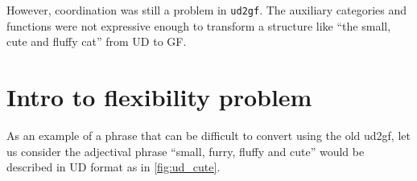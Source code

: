 
However, coordination was still a problem in \verb|ud2gf|. The auxiliary categories and functions were not expressive enough to transform a structure like ``the small, cute and fluffy cat'' from UD to GF.



\section{Intro to flexibility problem}

As an example of a phrase that can be difficult to convert using the old ud2gf, let us consider the adjectival phrase ``small, furry, fluffy and cute''
would be described in UD format as in \autoref{fig:ud_cute}.



